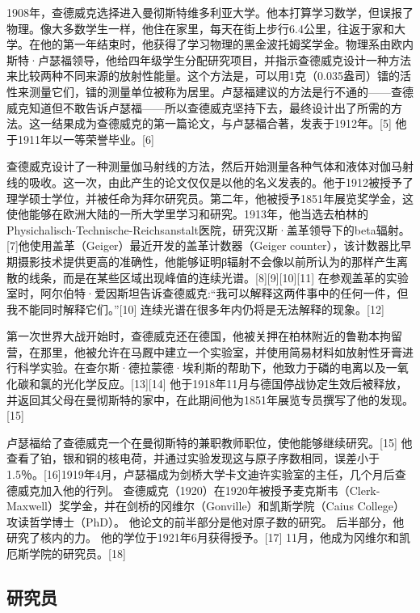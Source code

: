 1908年，查德威克选择进入曼彻斯特维多利亚大学。他本打算学习数学，但误报了物理。像大多数学生一样，他住在家里，每天在街上步行6.4公里，往返于家和大学。在他的第一年结束时，他获得了学习物理的黑金波托姆奖学金。物理系由欧内斯特·卢瑟福领导，他给四年级学生分配研究项目，并指示查德威克设计一种方法来比较两种不同来源的放射性能量。这个方法是，可以用1克（0.035盎司）镭的活性来测量它们，镭的测量单位被称为居里。卢瑟福建议的方法是行不通的——查德威克知道但不敢告诉卢瑟福——所以查德威克坚持下去，最终设计出了所需的方法。这一结果成为查德威克的第一篇论文，与卢瑟福合著，发表于1912年。[5] 他于1911年以一等荣誉毕业。[6]

查德威克设计了一种测量伽马射线的方法，然后开始测量各种气体和液体对伽马射线的吸收。这一次，由此产生的论文仅仅是以他的名义发表的。他于1912被授予了理学硕士学位，并被任命为拜尔研究员。第二年，他被授予1851年展览奖学金，这使他能够在欧洲大陆的一所大学里学习和研究。1913年，他当选去柏林的Physichalisch-Technische-Reichsanstalt医院，研究汉斯·盖革领导下的beta辐射。[7]他使用盖革（Geiger）最近开发的盖革计数器（Geiger counter），该计数器比早期摄影技术提供更高的准确性，他能够证明β辐射不会像以前所认为的那样产生离散的线条，而是在某些区域出现峰值的连续光谱。[8][9][10][11] 在参观盖革的实验室时，阿尔伯特·爱因斯坦告诉查德威克:“我可以解释这两件事中的任何一件，但我不能同时解释它们。”[10] 连续光谱在很多年内仍将是无法解释的现象。[12]

第一次世界大战开始时，查德威克还在德国，他被关押在柏林附近的鲁勒本拘留营，在那里，他被允许在马厩中建立一个实验室，并使用简易材料如放射性牙膏进行科学实验。在查尔斯·德拉蒙德·埃利斯的帮助下，他致力于磷的电离以及一氧化碳和氯的光化学反应。[13][14] 他于1918年11月与德国停战协定生效后被释放，并返回其父母在曼彻斯特的家中，在此期间他为1851年展览专员撰写了他的发现。[15]

卢瑟福给了查德威克一个在曼彻斯特的兼职教师职位，使他能够继续研究。[15] 他查看了铂，银和铜的核电荷，并通过实验发现这与原子序数相同，误差小于1.5％。[16]1919年4月，卢瑟福成为剑桥大学卡文迪许实验室的主任，几个月后查德威克加入他的行列。 查德威克（1920）在1920年被授予麦克斯韦（Clerk-Maxwell）奖学金，并在剑桥的冈维尔（Gonville）和凯斯学院（Caius College）攻读哲学博士（PhD）。 他论文的前半部分是他对原子数的研究。 后半部分，他研究了核内的力。 他的学位于1921年6月获得授予。[17] 11月，他成为冈维尔和凯厄斯学院的研究员。[18]

\subsection{研究员}
